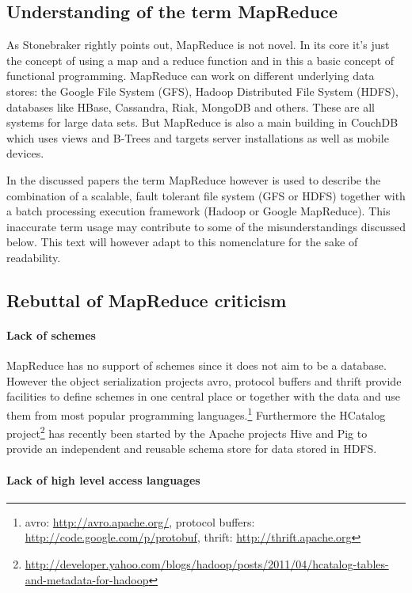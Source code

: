 \documentclass[12pt,a4paper]{scrartcl}		%
\begin{document}
\subsection{Understanding of the term MapReduce}
As Stonebraker rightly points out, MapReduce is not novel. In its core it's just the concept of using a map and a reduce function and in this a basic concept of functional programming. MapReduce can work on different underlying data stores: the Google File System (GFS), Hadoop Distributed File System (HDFS), databases like HBase, Cassandra, Riak, MongoDB and others. These are all systems for large data sets. But MapReduce is also a main building in CouchDB which uses views and B-Trees and targets server installations as well as mobile devices.

In the discussed papers the term MapReduce however is used to describe the combination of a scalable, fault tolerant file system (GFS or HDFS) together with a batch processing execution framework (Hadoop or Google MapReduce).
This inaccurate term usage may contribute to some of the misunderstandings discussed below. This text will however adapt to this nomenclature for the sake of readability.

\subsection{Rebuttal of MapReduce criticism}
\paragraph{Lack of schemes}
MapReduce has no support of schemes since it does not aim to be a database. However the object serialization projects avro, protocol buffers and thrift provide facilities to define schemes in one central place or together with the data and use them from most popular programming languages.\footnote{avro: \url{http://avro.apache.org/}, protocol buffers: \url{http://code.google.com/p/protobuf}, thrift: \url{http://thrift.apache.org}}
Furthermore the HCatalog project\footnote{\url{http://developer.yahoo.com/blogs/hadoop/posts/2011/04/hcatalog-tables-and-metadata-for-hadoop}} has recently been started by the Apache projects Hive and Pig to provide an independent and reusable schema store for data stored in HDFS.

\paragraph{Lack of high level access languages}
\end{document}
